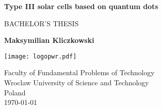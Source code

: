 \begin{titlepage}
   \begin{center}
       \vspace*{1cm}
 
       \textbf{\huge Type III solar cells based on quantum dots}
 
       \vspace{1.5cm}
       
 	   \Large BACHELOR'S THESIS
       
       \vfill
 	   
	   \textbf{Maksymilian Kliczkowski}
       \vspace{0.8cm}
 
       \texttt{[image: logopwr.pdf]}
 
       Faculty of Fundamental Problems of Technology\\
       Wroclaw University of Science and Technology\\
       Poland\\
       \today
 
   \end{center}
\end{titlepage}
